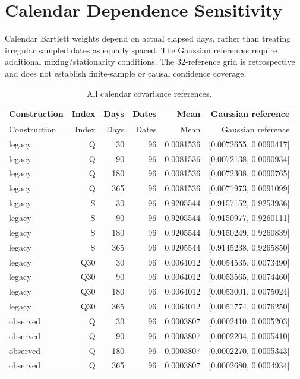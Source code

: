 \documentclass[10pt]{article}
\begin{document}
\section{Calendar Dependence Sensitivity}
Calendar Bartlett weights depend on actual elapsed days, rather than treating irregular sampled dates as equally spaced. The Gaussian references require additional mixing/stationarity conditions. The 32-reference grid is retrospective and does not establish finite-sample or causal confidence coverage.


\small\setlength{\tabcolsep}{3pt}
\begin{longtable}{lrrrrr}
\caption{All calendar covariance references.}\label{tab:calendar_references}\\
\toprule
Construction & Index & Days & Dates & Mean & Gaussian reference \\\midrule\endfirsthead
\toprule
Construction & Index & Days & Dates & Mean & Gaussian reference \\\midrule\endhead
legacy & Q & 30 & 96 & 0.0081536 & [0.0072655, 0.0090417] \\
legacy & Q & 90 & 96 & 0.0081536 & [0.0072138, 0.0090934] \\
legacy & Q & 180 & 96 & 0.0081536 & [0.0072308, 0.0090765] \\
legacy & Q & 365 & 96 & 0.0081536 & [0.0071973, 0.0091099] \\
legacy & S & 30 & 96 & 0.9205544 & [0.9157152, 0.9253936] \\
legacy & S & 90 & 96 & 0.9205544 & [0.9150977, 0.9260111] \\
legacy & S & 180 & 96 & 0.9205544 & [0.9150249, 0.9260839] \\
legacy & S & 365 & 96 & 0.9205544 & [0.9145238, 0.9265850] \\
legacy & Q30 & 30 & 96 & 0.0064012 & [0.0054535, 0.0073490] \\
legacy & Q30 & 90 & 96 & 0.0064012 & [0.0053565, 0.0074460] \\
legacy & Q30 & 180 & 96 & 0.0064012 & [0.0053001, 0.0075024] \\
legacy & Q30 & 365 & 96 & 0.0064012 & [0.0051774, 0.0076250] \\
observed & Q & 30 & 96 & 0.0003807 & [0.0002410, 0.0005203] \\
observed & Q & 90 & 96 & 0.0003807 & [0.0002204, 0.0005410] \\
observed & Q & 180 & 96 & 0.0003807 & [0.0002270, 0.0005343] \\
observed & Q & 365 & 96 & 0.0003807 & [0.0002680, 0.0004934] \\

\end{longtable}
\end{document}
